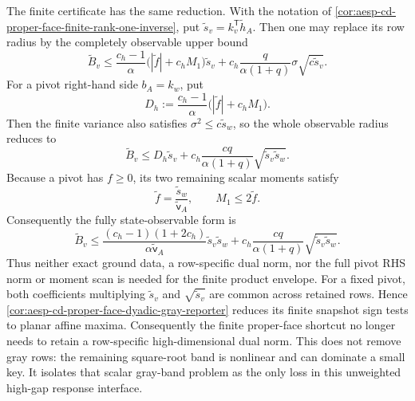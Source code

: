 \begin{corollary}
The finite certificate has the same reduction.  With the notation of
\cref{cor:aesp-cd-proper-face-finite-rank-one-inverse}, put
\(\widetilde s_v=k_v^{\mathsf T}\widetilde h_A\).  Then one may replace its
row radius by the completely observable upper bound
\begin{equation}
 \widetilde B_v\leq
 \frac{c_h-1}{\alpha}
 \bigl(|\widetilde f|+c_hM_1\bigr)\widetilde s_v
 +c_h\frac{q}{\alpha(1+q)}\sigma\sqrt{c\widetilde s_v}.
 \label{eq:aesp-cd-proper-face-finite-unweighted-row-band}
\end{equation}
For a pivot right-hand side \(b_A=k_w\), put
\begin{equation*}
 D_h:=
 \frac{c_h-1}{\alpha}
 \bigl(|\widetilde f|+c_hM_1\bigr).
\end{equation*}
Then the finite variance also satisfies
\(\sigma^2\leq c\widetilde s_w\), so the whole observable radius reduces to
\begin{equation}
 \widetilde B_v
 \leq
 D_h\widetilde s_v+
 c_h\frac{cq}{\alpha(1+q)}
 \sqrt{\widetilde s_v\widetilde s_w}.
 \label{eq:aesp-cd-proper-face-finite-pivot-product-band}
\end{equation}
Because a pivot has \(f\geq0\), its two remaining scalar moments satisfy
\begin{equation*}
 \widetilde f=\frac{\widetilde s_w}{\widetilde{\mathsf v}_A},
 \qquad
 M_1\leq2\widetilde f.
\end{equation*}
Consequently the fully state-observable form is
\begin{equation}
 \widetilde B_v
 \leq
 \frac{(c_h-1)(1+2c_h)}
      {\alpha\widetilde{\mathsf v}_A}
 \widetilde s_v\widetilde s_w
 +c_h\frac{cq}{\alpha(1+q)}
 \sqrt{\widetilde s_v\widetilde s_w}.
 \label{eq:aesp-cd-proper-face-finite-pivot-state-band}
\end{equation}
Thus neither exact ground data, a row-specific dual norm, nor the full pivot
RHS norm or moment scan is needed for the finite product envelope.
For a fixed pivot, both coefficients multiplying
\(\widetilde s_v\) and \(\sqrt{\widetilde s_v}\) are common across retained
rows.  Hence
\cref{cor:aesp-cd-proper-face-dyadic-gray-reporter} reduces its finite
snapshot sign tests to planar affine maxima.
Consequently the finite proper-face shortcut no longer needs to retain a
row-specific high-dimensional dual norm.  This does not remove gray rows:
the remaining square-root band is nonlinear and can dominate a small key.
It isolates that scalar gray-band problem as the only loss in this
unweighted high-gap response interface.
\end{corollary}

